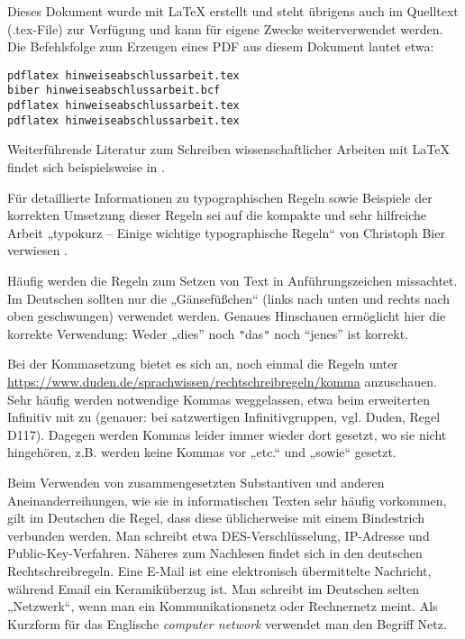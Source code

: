 \documentclass[
    fontsize=12pt,
    headings=small,
    parskip=half,           %
    bibliography=totoc,
    numbers=noenddot,       %
    open=any,               %
    ]{scrreprt}
\begin{document}
Dieses Dokument wurde mit LaTeX erstellt und steht übrigens auch im Quelltext (.tex-File) zur Verfügung und kann für eigene Zwecke weiterverwendet werden. Die Befehlsfolge zum Erzeugen eines PDF aus diesem Dokument lautet etwa:

\begin{lstlisting}[numbers=none,xleftmargin=6pt]
pdflatex hinweiseabschlussarbeit.tex
biber hinweiseabschlussarbeit.bcf
pdflatex hinweiseabschlussarbeit.tex
pdflatex hinweiseabschlussarbeit.tex
\end{lstlisting}

Weiterführende Literatur zum Schreiben wissenschaftlicher Arbeiten mit LaTeX findet sich beispielsweise in \cite{Schl2013}.

Für detaillierte Informationen zu typographischen Regeln sowie Beispiele der korrekten Umsetzung dieser Regeln sei auf die kompakte und sehr hilfreiche Arbeit „typokurz -- Einige wichtige typographische Regeln“ von Christoph Bier verwiesen \cite{Bier2009}.

Häufig werden die Regeln zum Setzen von Text in Anführungszeichen missachtet. Im Deutschen sollten nur die „Gänsefüßchen“ (links nach unten und rechts nach oben geschwungen) verwendet werden. Genaues Hinschauen ermöglicht hier die korrekte Verwendung: Weder „dies” noch {\verb#"#}das{\verb#"#} noch “jenes” ist korrekt.

Bei der Kommasetzung bietet es sich an, noch einmal die Regeln unter \url{https://www.duden.de/sprachwissen/rechtschreibregeln/komma} anzuschauen. Sehr häufig werden notwendige Kommas weggelassen, etwa beim erweiterten Infinitiv mit zu (genauer: bei satzwertigen Infinitivgruppen, vgl. Duden, Regel D117). Dagegen werden Kommas leider immer wieder dort gesetzt, wo sie nicht hingehören, z.B. werden keine Kommas vor „etc.“ und „sowie“ gesetzt.

Beim Verwenden von zusammengesetzten Substantiven und anderen Aneinanderreihungen, wie sie in informatischen Texten sehr häufig vorkommen, gilt im Deutschen die Regel, dass diese üblicherweise mit einem Bindestrich verbunden werden. Man schreibt etwa DES-Verschlüsselung, IP-Adresse und Public-Key-Verfahren. Näheres zum Nachlesen findet sich in den deutschen Rechtschreibregeln. Eine E-Mail ist eine elektronisch übermittelte Nachricht, während Email ein Keramiküberzug ist. Man schreibt im Deutschen selten „Netzwerk“, wenn man ein Kommunikationsnetz oder Rechnernetz meint. Als Kurzform für das Englische \emph{computer network} verwendet man den Begriff Netz.
\end{document}
